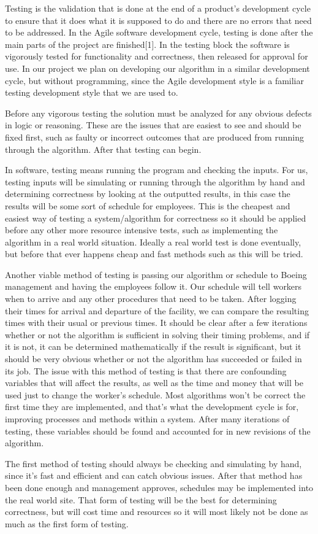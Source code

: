 \documentclass[a4,draftclsnofoot,onecolumn,margin=0.75,10pt]{IEEEtran}
\begin{document}
{\color{black}
   Testing is the validation that is done at the end of a product's development cycle to ensure that it does what it is supposed to do and there are no errors that need to be addressed. In the Agile software development cycle, testing is done after the main parts of the project are finished[1]. In the testing block the software is vigorously tested for functionality and correctness, then released for approval for use. In our project we plan on developing our algorithm in a similar development cycle, but without programming, since the Agile development style is a familiar testing development style that we are used to.

   Before any vigorous testing the solution must be analyzed for any obvious defects in logic or reasoning. These are the issues that are easiest to see and should be fixed first, such as faulty or incorrect outcomes that are produced from running through the algorithm. After that testing can begin. 

   In software, testing means running the program and checking the inputs. For us, testing inputs will be simulating or running through the algorithm by hand and determining correctness by looking at the outputted results, in this case the results will be some sort of schedule for employees. This is the cheapest and easiest way of testing a system/algorithm for correctness so it should be applied before any other more resource intensive tests, such as implementing the algorithm in a real world situation. Ideally a real world test is done eventually, but before that ever happens cheap and fast methods such as this will be tried.
   
   Another viable method of testing is passing our algorithm or schedule to Boeing management and having the employees follow it. Our schedule will tell workers when to arrive and any other procedures that need to be taken. After logging their times for arrival and departure of the facility, we can compare the resulting times with their usual or previous times. It should be clear after a few iterations whether or not the algorithm is sufficient in solving their timing problems, and if it is not, it can be determined mathematically if the result is significant, but it should be very obvious whether or not the algorithm has succeeded or failed in its job. The issue with this method of testing is that there are confounding variables that will affect the results, as well as the time and money that will be used just to change the worker's schedule. Most algorithms won't be correct the first time they are implemented, and that's what the development cycle is for, improving processes and methods within a system. After many iterations of testing, these variables should be found and accounted for in new revisions of the algorithm.

   The first method of testing should always be checking and simulating by hand, since it's fast and efficient and can catch obvious issues. After that method has been done enough and management approves, schedules may be implemented into the real world site. That form of testing will be the best for determining correctness, but will cost time and resources so it will most likely not be done as much as the first form of testing.}
\end{document}
